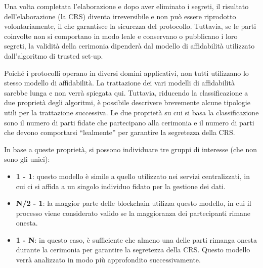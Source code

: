 Una volta completata l'elaborazione e dopo aver eliminato i segreti, il risultato dell'elaborazione (la CRS) diventa
irreversibile e non può essere riprodotto volontariamente, il che garantisce la sicurezza del protocollo. Tuttavia, se
le parti coinvolte non si comportano in modo leale e conservano o pubblicano i loro segreti, la validità della cerimonia
dipenderà dal modello di affidabilità utilizzato dall'algoritmo di trusted set-up. 

Poiché i protocolli operano in diversi domini applicativi, non tutti utilizzano lo stesso modello di affidabilità. La
trattazione dei vari modelli di affidabilità sarebbe lunga e non verrà spiegata qui. Tuttavia, riducendo la
classificazione a due proprietà degli algoritmi, è possibile descrivere brevemente alcune tipologie utili per la
trattazione successiva. Le due proprietà su cui si basa la classificazione sono il numero di parti fidate che
partecipano alla cerimonia e il numero di parti che devono comportarsi “lealmente” per garantire la segretezza della
CRS.

In base a queste proprietà, si possono individuare tre gruppi di interesse (che non sono gli unici):
\begin{itemize}
    \item \textbf{1 - 1}: questo modello è simile a quello utilizzato nei servizi centralizzati, in cui ci si affida a un singolo
    individuo fidato per la gestione dei dati. 
    \item \textbf{N/2 - 1}: la maggior parte delle blockchain utilizza questo modello, in
    cui il processo viene considerato valido se la maggioranza dei partecipanti rimane onesta.
    \item \textbf{1 - N}: in questo caso, è sufficiente che almeno una delle parti rimanga onesta durante la cerimonia per garantire la segretezza della CRS.
    Questo modello verrà analizzato in modo più approfondito successivamente.
\end{itemize}

